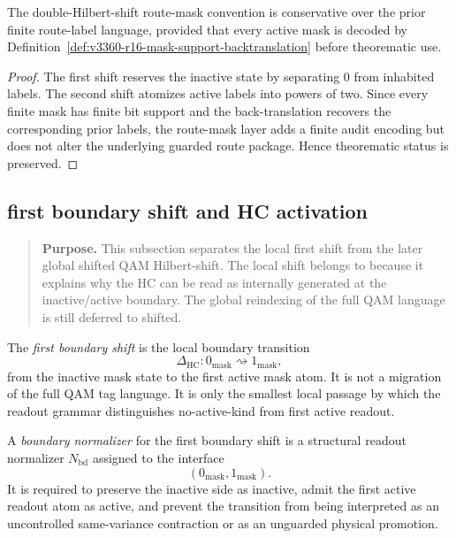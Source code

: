 \begin{lemma}
\label{lem:v3360-r16-double-shift-conservativity}
The double-Hilbert-shift route-mask convention is conservative over the prior finite route-label language, provided that every active mask is decoded by Definition~\ref{def:v3360-r16-mask-support-backtranslation} before theorematic use.
\end{lemma}

\begin{proof}
The first shift reserves the inactive state by separating $0$ from inhabited labels. The second shift atomizes active labels into powers of two. Since every finite mask has finite bit support and the back-translation recovers the corresponding prior labels, the route-mask layer adds a finite audit encoding but does not alter the underlying guarded route package. Hence theorematic status is preserved.
\end{proof}

\subsection*{first boundary shift and HC activation}
\label{subsec:v3360-r16-first-boundary-shift-hc-activation}

\begin{quote}\small
\noindent\textbf{Purpose.} This subsection separates the local first shift from
 the later global shifted QAM Hilbert-shift. The local shift belongs to 
because it explains why the HC can be read as internally generated at the
inactive/active boundary. The global reindexing of the full QAM language is
still deferred to shifted.
\end{quote}

\begin{definition}
\label{def:v3360-r16-first-boundary-shift}
The \emph{first boundary shift} is the local boundary transition
\[
 \Delta_{\mathrm{HC}}:
 0_{\mathrm{mask}}\rightsquigarrow 1_{\mathrm{mask}},
\]
from the inactive mask state to the first active mask atom. It is not a
migration of the full QAM tag language. It is only the smallest local passage
by which the readout grammar distinguishes no-active-kind from first active
readout.
\end{definition}

\begin{definition}
\label{def:v3360-r16-boundary-normalizer}
A \emph{boundary normalizer} for the first boundary shift is a structural
readout normalizer $N_{\mathrm{bd}}$ assigned to the interface
\[
 (0_{\mathrm{mask}},1_{\mathrm{mask}}).
\]
It is required to preserve the inactive side as inactive, admit the first active
readout atom as active, and prevent the transition from being interpreted as an
uncontrolled same-variance contraction or as an unguarded physical promotion.
\end{definition}

